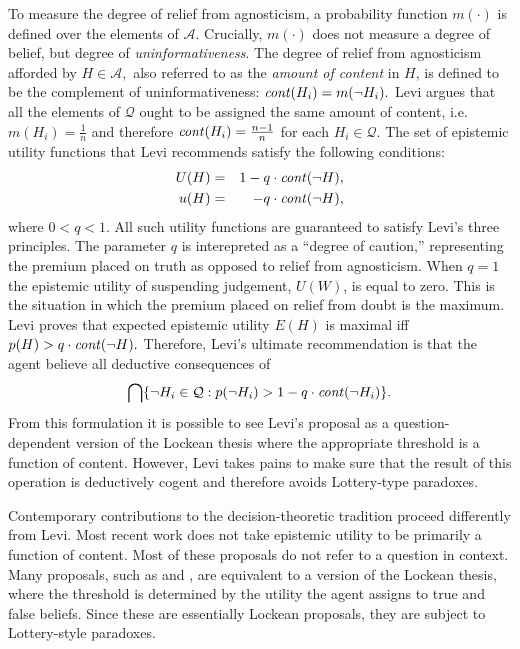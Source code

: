 To measure the degree of relief from agnosticism, a probability function
$m(\cdot)$ is defined over the elements of $\mathcal{A}$. Crucially, $m(\cdot)$
does not measure a degree of belief, but degree of {\em uninformativeness}.  The
degree of relief from agnosticism afforded by $H\in \mathcal{A},$ also referred
to as the {\em amount of content} in $H$,  is defined to be the complement of
uninformativeness: $\text{\textit{cont}}(H_i) = m(\neg H_i).$  Levi argues that
all the elements of $\mathcal{Q}$ ought to be assigned the same amount of
content, i.e. $m(H_i)=\frac{1}{n}$ and therefore $\text{\textit{cont}}(H_i)=
\frac{n-1}{n}$  for each $H_i\in\mathcal{Q}$. The set of epistemic utility
functions that Levi recommends satisfy the following conditions:
$$
 \begin{aligned}
    U(H) &=& 1 - q\cdot \text{\textit{cont}}(\neg H),\\
    u(H) &=& \hspace{7pt} - q\cdot \text{\textit{cont}}(\neg H),
  \end{aligned}
$$
where $0<q<1.$ All such utility functions are guaranteed to satisfy Levi's three
principles. The parameter $q$ is interepreted as a ``degree of caution,''
representing the premium  placed on truth as opposed to relief from agnosticism.
When $q=1$ the epistemic utility of suspending judgement, $U(W)$, is equal to
zero. This is the situation in which the premium placed on relief from doubt is
the maximum. Levi proves that expected epistemic utility $E(H)$ is maximal iff
$p(H)> q \cdot \text{\textit{cont}}(\neg H).$ Therefore, Levi's ultimate
recommendation is that the agent believe all deductive consequences of $$\bigcap
\{ \neg H_i \in \mathcal{Q} : p(\neg H_i)> 1 - q \cdot \text{\textit{cont}}(\neg
H_i) \}.$$ From this formulation  it is possible to see Levi's proposal as a
question-dependent version of the Lockean thesis where the appropriate threshold
is a function of content. However, Levi takes pains to make sure that the result
of this operation is deductively cogent and therefore  avoids Lottery-type
paradoxes.

Contemporary contributions to the decision-theoretic tradition proceed
differently from Levi. Most recent work does not take epistemic utility to be
primarily a function of content. Most of these proposals do not refer to a
question in context.  Many proposals, such as \citet{easwaran2015truthlove} and
\citet{dorst2017lockeans}, are equivalent to a version of the Lockean thesis,
where the threshold is determined by the utility the agent assigns to true and
false beliefs. Since these are essentially Lockean proposals, they are subject
to Lottery-style paradoxes.





%  

% 